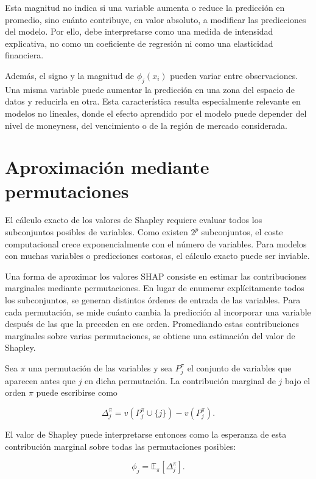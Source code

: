 Esta magnitud no indica si una variable aumenta o reduce la predicción en promedio, sino cuánto contribuye, en valor absoluto, a modificar las predicciones del modelo. Por ello, debe interpretarse como una medida de intensidad explicativa, no como un coeficiente de regresión ni como una elasticidad financiera.

Además, el signo y la magnitud de \(\phi_j(x_i)\) pueden variar entre observaciones. Una misma variable puede aumentar la predicción en una zona del espacio de datos y reducirla en otra. Esta característica resulta especialmente relevante en modelos no lineales, donde el efecto aprendido por el modelo puede depender del nivel de moneyness, del vencimiento o de la región de mercado considerada.

\section{Aproximación mediante permutaciones}

El cálculo exacto de los valores de Shapley requiere evaluar todos los subconjuntos posibles de variables. Como existen \(2^p\) subconjuntos, el coste computacional crece exponencialmente con el número de variables. Para modelos con muchas variables o predicciones costosas, el cálculo exacto puede ser inviable.

Una forma de aproximar los valores SHAP consiste en estimar las contribuciones marginales mediante permutaciones. En lugar de enumerar explícitamente todos los subconjuntos, se generan distintos órdenes de entrada de las variables. Para cada permutación, se mide cuánto cambia la predicción al incorporar una variable después de las que la preceden en ese orden. Promediando estas contribuciones marginales sobre varias permutaciones, se obtiene una estimación del valor de Shapley.

Sea \(\pi\) una permutación de las variables y sea \(P_j^\pi\) el conjunto de variables que aparecen antes que \(j\) en dicha permutación. La contribución marginal de \(j\) bajo el orden \(\pi\) puede escribirse como

\begin{equation}
\Delta_j^\pi
=
v(P_j^\pi \cup \{j\})
-
v(P_j^\pi).
\label{eq:shap-permutation-marginal}
\end{equation}

El valor de Shapley puede interpretarse entonces como la esperanza de esta contribución marginal sobre todas las permutaciones posibles:

\begin{equation}
\phi_j
=
\mathbb{E}_{\pi}
\left[
\Delta_j^\pi
\right].
\label{eq:shap-permutation-expectation}
\end{equation}

